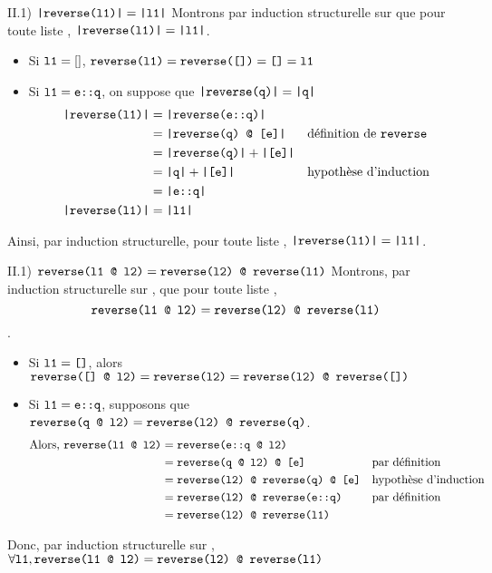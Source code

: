\begin{question}{II.1) }{$\texttt{|reverse(l1)|} = \texttt{|l1|}$}
    Montrons par induction structurelle sur  que pour toute liste , $\texttt{|reverse(l1)|} = \texttt{|l1|}$. \begin{itemize}
        \item Si $\texttt{l1} = []$, $\texttt{reverse(l1)} = \texttt{reverse([])} = \texttt{[]}  = \texttt{l1}$
        \item Si $\texttt{l1} = \texttt{e::q}$, on suppose que $\texttt{|reverse(q)|} = \texttt{|q|}$ \begin{align*}
            \texttt{|reverse(l1)|} &= \texttt{|reverse(e::q)|} &&\\
            &= \texttt{|reverse(q) @ [e]|} && \text{définition de \texttt{reverse}}\\
            &= \texttt{|reverse(q)|} + \texttt{|[e]|} && \\
            &= \texttt{|q|} + \texttt{|[e]|} && \text{hypothèse d'induction}\\
            &= \texttt{|e::q|} && \\
            \texttt{|reverse(l1)|} &= \texttt{|l1|} &&
        \end{align*}
    \end{itemize}
    Ainsi, par induction structurelle, pour toute liste , $\texttt{|reverse(l1)|} = \texttt{|l1|}$.
\end{question}

\begin{question}{II.1) }{$\texttt{reverse(l1 @ l2)} = \texttt{\texttt{reverse(l2)} @ \texttt{reverse(l1)}}$}
    Montrons, par induction structurelle sur , que pour toute liste , $$\texttt{reverse(l1 @ l2)} = \texttt{\texttt{reverse(l2)} @ \texttt{reverse(l1)}}$$. \begin{itemize}
        \item Si $\texttt{l1} = \texttt{[]}$, alors $\texttt{reverse([] @ l2)} = \texttt{reverse(l2)} = \texttt{\texttt{reverse(l2)} @ \texttt{reverse([])}}$        
        \item Si $\texttt{l1} = \texttt{e::q}$, supposons que $\texttt{reverse(q @ l2)} = \texttt{\texttt{reverse(l2)} @ \texttt{reverse(q)}}$. \begin{align*}
            \text{Alors, } \texttt{reverse(l1 @ l2)} &= \texttt{reverse(e::q @ l2)} && \\
            &= \texttt{\texttt{reverse(q @ l2)} @ [e]} && \text{par définition} \\
            &= \texttt{\texttt{reverse(l2)} @ \texttt{reverse(q)} @ [e]} && \text{hypothèse d'induction} \\
            &= \texttt{\texttt{reverse(l2)} @ \texttt{reverse(e::q)}} && \text{par définition} \\
            &= \texttt{\texttt{reverse(l2)} @ \texttt{reverse(l1)}}
        \end{align*}
    \end{itemize}
    Donc, par induction structurelle sur , $\forall \texttt{l1}, \texttt{reverse(l1 @ l2)} = \texttt{\texttt{reverse(l2)} @ \texttt{reverse(l1)}}$
\end{question}

